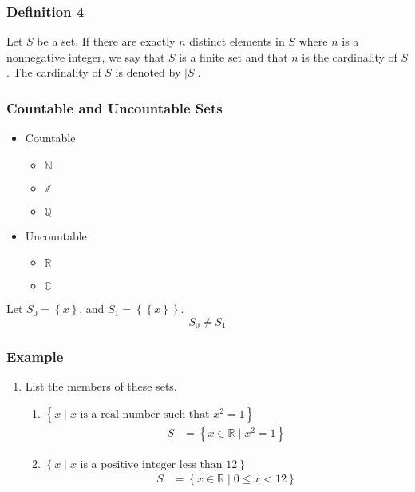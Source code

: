 \documentclass{article}
\begin{document}
\subsubsection{Definition 4}

Let $ S $ be a set. If there are exactly $ n $ distinct elements in $ S $ where $ n $ is a nonnegative integer, we say that $ S $ is a finite set and that $ n $ is the cardinality of $ S $. The cardinality of $ S $ is denoted by $ |S| $.

\subsubsection{Countable and Uncountable Sets}

\begin{itemize}
	\item Countable
	      \begin{itemize}
		      \item $ \mathbb{N} $
		      \item $ \mathbb{Z} $
		      \item $ \mathbb{Q} $
	      \end{itemize}
	\item Uncountable
	      \begin{itemize}
		      \item $ \mathbb{R} $
		      \item $ \mathbb{C} $
	      \end{itemize}
\end{itemize}

Let $ S_0 = \left\{ x \right\} $, and $ S_1 = \left\{ \left\{ x \right\} \right\} $.
\begin{equation}
	S_0 \neq S_1
\end{equation}

\subsubsection{Example}

\begin{enumerate}
	\item List the members of these sets.
	      \begin{enumerate}[label = \textbf{\alph*)}]
		      \item $ \left\{ x \mid x \text{ is a real number such that } x^2 = 1 \right\} $
		            \begin{align*}
			            S & = \left\{ x \in \mathbb{R} \mid x^2 = 1 \right\}
		            \end{align*}
		      \item $ \left\{ x \mid x \text{ is a positive integer less than 12} \right\} $
		            \begin{align*}
			            S & = \left\{ x \in \mathbb{R} \mid 0 \leq x < 12 \right\}
		            \end{align*}
	      \end{enumerate}
\end{enumerate}
\end{document}
